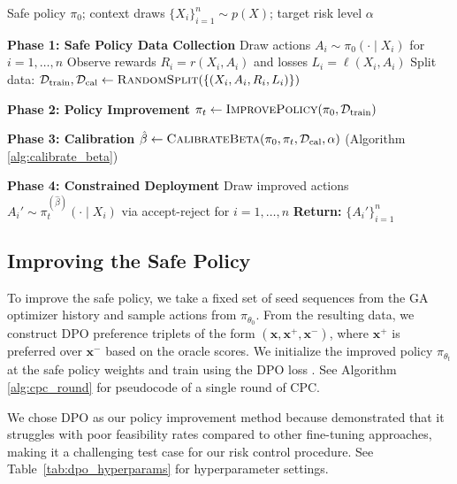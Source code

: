 \begin{algorithm}[t]
    \caption{Conformal Policy Control}
    \label{alg:cpc_round}
    \begin{algorithmic}
        \REQUIRE Safe policy $\pi_0$; context draws $\{X_i\}_{i=1}^n \sim p(X)$; target risk level $\alpha$
        \item[] \textbf{Phase 1: Safe Policy Data Collection}
        \STATE Draw actions $A_i \sim \pi_0(\cdot \mid X_i)$ for $i = 1, \ldots, n$
        \STATE Observe rewards $R_i = r(X_i, A_i)$ and losses $L_i = \ell(X_i, A_i)$
        \STATE Split data: $\mathcal{D}_{\text{train}}, \mathcal{D}_{\text{cal}} \gets \textsc{RandomSplit}(\{(X_i, A_i, R_i, L_i)\})$
        \item[] \textbf{Phase 2: Policy Improvement}
        \STATE $\pi_t \gets \textsc{ImprovePolicy}(\pi_0, \mathcal{D}_{\text{train}})$
        \item[] \textbf{Phase 3: Calibration}
        \STATE $\hat{\beta} \gets \textsc{CalibrateBeta}(\pi_0, \pi_t, \mathcal{D}_{\text{cal}}, \alpha)$ (Algorithm \ref{alg:calibrate_beta})
        \item[] \textbf{Phase 4: Constrained Deployment}
        \STATE Draw improved actions $A_i' \sim \pi_t^{(\hat{\beta})}(\cdot \mid X_i)$ via accept-reject for $i = 1, \ldots, n$
        \STATE \textbf{Return:} $\{A_i'\}_{i=1}^n$
    \end{algorithmic}
\end{algorithm}

\subsection{Improving the Safe Policy}
\label{subsec:policy_improvement}

To improve the safe policy, we take a fixed set of seed sequences from the GA optimizer history and sample actions from $\pi_{\theta_0}$. From the resulting data, we construct DPO preference triplets of the form $(\mathbf{x}, \mathbf{x}^+, \mathbf{x}^-)$, where $\mathbf{x}^+$ is preferred over $\mathbf{x}^-$ based on the oracle scores. We initialize the improved policy $\pi_{\theta_t}$ at the safe policy weights and train using the DPO loss \citep{rafailov2023direct}. See Algorithm \ref{alg:cpc_round} for pseudocode of a single round of CPC.

We chose DPO as our policy improvement method because \citet{chen2025generalists} demonstrated that it struggles with poor feasibility rates compared to other fine-tuning approaches, making it a challenging test case for our risk control procedure. See Table~\ref{tab:dpo_hyperparams} for hyperparameter settings.

